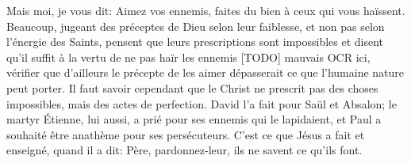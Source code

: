 Mais moi, je vous dit:
	Aimez vos ennemis, faites du bien à ceux qui vous haïssent.
Beaucoup, jugeant des préceptes de Dieu selon leur faiblesse,
	et non pas selon l’énergie des Saints,
	pensent que leurs prescriptions sont impossibles
	et disent qu’il suffit à la vertu de ne pas haïr les ennemis [TODO] mauvais OCR ici, vérifier
	que d’ailleurs le précepte de les aimer dépasserait
	ce que l’humaine nature peut porter.
Il faut savoir cependant que le Christ ne prescrit pas des choses impossibles,
	mais des actes de perfection.
David l’a fait pour Saül et Absalon;
	le martyr Étienne, lui aussi, a prié pour ses ennemis qui le lapidaient,
	et Paul a souhaité être anathème pour ses persécuteurs.
C’est ce que Jésus a fait et enseigné, quand il a dit:
	Père, pardonnez-leur, ils ne savent ce qu’ils font.
